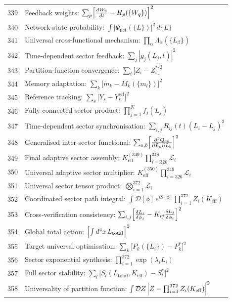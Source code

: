\documentclass[12pt,a4paper]{article}
\begin{document}
\begin{longtable}{r l}
		339 & Feedback weights: $\sum_p\Bigl[\frac{dW_p}{dt} - H_p(\{W_q\})\Bigr]^2$ \\
		340 & Network‑state probability: $\int|\Psi_{\text{net}}(\{L\})|^2\,d\{L\}$ \\
		341 & Universal cross‑functional mechanism: $\prod_\alpha\Lambda_\alpha(\{L_\beta\})$ \\
		342 & Time‑dependent sector feedback: $\sum_j|g_j(L_j,t)|^2$ \\
		343 & Partition‑function convergence: $\sum_i\bigl[Z_i - Z_i^*\bigr]^2$ \\
		344 & Memory adaptation: $\sum_k\bigl[\dot m_k - M_k(\{m_l\})\bigr]^2$ \\
		345 & Reference tracking: $\sum_s\bigl[Y_s - Y_s^{\text{ref}}\bigr]^2$ \\
		346 & Fully‑connected sector product: $\prod_{j=1}^N f_j(L_j)$ \\
		347 & Time‑dependent sector synchronisation: $\sum_{i,j}R_{ij}(t)(L_i - L_j)^2$ \\
		348 & Generalised inter‑sector functional: $\sum_{a,b}\Bigl[\frac{\partial^2 Q_{ab}}{\partial L_a\partial L_b}\Bigr]^2$ \\
		349 & Final adaptive sector assembly: $K^{(349)}_{\mathrm{eff}}\prod_{i=326}^{348}\mathcal{L}_i$ \\
		350 & Universal adaptive sector multiplier: $K^{(350)}_{\mathrm{eff}}\prod_{i=326}^{349}\mathcal{L}_i$ \\
		351 & Universal sector tensor product: $\bigotimes_{i=1}^{372}\mathcal{L}_i$ \\
		352 & Coordinated sector path integral: $\int\mathcal{D}[\phi]\,e^{iS[\phi]}\prod_{i=1}^{372}Z_i(K_{\mathrm{eff}})$ \\
		353 & Cross‑verification consistency: $\sum_{i,j}\Bigl[\frac{\delta L_i}{\delta\phi_j} - K_{ij}\frac{\delta L_j}{\delta\phi_i}\Bigr]^2$ \\
		354 & Global total action: $\Bigl[\int d^4x\,L_{\text{total}}\Bigr]^2$ \\
		355 & Target universal optimisation: $\sum_k\bigl[P_k(\{L_i\}) - P_k^*\bigr]^2$ \\
		356 & Sector exponential synthesis: $\prod_{i=1}^{372}\exp(\lambda_i L_i)$ \\
		357 & Full sector stability: $\sum_l\bigl[S_l(L_{\text{total}},K_{\mathrm{eff}}) - S_l^*\bigr]^2$ \\
		358 & Universality of partition function: $\int\mathcal{D}Z\,\Bigl|Z - \prod_{i=1}^{372}Z_i(K_{\mathrm{eff}})\Bigr|^2$ \\

\end{longtable}
\end{document}
